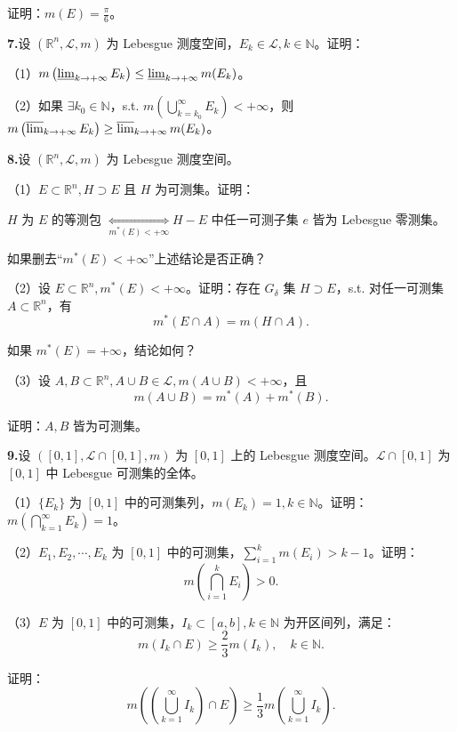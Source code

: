 \documentclass[11pt,a4paper]{article}
\begin{document}
\par\noindent 证明：$m(E)=\frac{\pi}{6}$。
\par{}\noindent\textbf{7.}\quad 设 $(\mathbb R^n,\mathcal L,m)$ 为 Lebesgue 测度空间，$E_k\in\mathcal L,k\in\mathbb N$。证明：
\par\noindent （1）$m\left(\varliminf_{k\to+\infty}E_k\right)\leq\varliminf_{k\to+\infty}m(E_k)$。
\par\noindent （2）如果 $\exists k_0\in\mathbb N$，s.t. $m\left(\bigcup_{k=k_0}^\infty E_k\right)<+\infty$，则 $m\left(\varlimsup_{k\to+\infty}E_k\right)\geq\varlimsup_{k\to+\infty}m(E_k)$。
\par{}\noindent\textbf{8.}\quad 设 $(\mathbb R^n,\mathcal L,m)$ 为 Lebesgue 测度空间。
\par\noindent （1）$E\subset\mathbb R^n,H\supset E$ 且 $H$ 为可测集。证明：
\par\noindent $H$ 为 $E$ 的等测包 $\underset{m^*(E)<+\infty}{\Longleftrightarrow}H-E$ 中任一可测子集 $e$ 皆为 Lebesgue 零测集。
\par\noindent 如果删去“$m^*(E)<+\infty$”上述结论是否正确？
\par\noindent （2）设 $E\subset\mathbb R^n,m^*(E)<+\infty$。证明：存在 $G_\delta$ 集 $H\supset E$，s.t. 对任一可测集 $A\subset\mathbb R^n$，有
\[m^*(E\cap A)=m(H\cap A).\]
\par\noindent 如果 $m^*(E)=+\infty$，结论如何？
\par\noindent （3）设 $A,B\subset\mathbb R^n,A\cup B\in\mathcal L,m(A\cup B)<+\infty$，且
\[m(A\cup B)=m^*(A)+m^*(B).\]
\par\noindent 证明：$A,B$ 皆为可测集。
\par{}\noindent\textbf{9.}\quad 设 $([0,1],\mathcal L\cap[0,1],m)$ 为 $[0,1]$ 上的 Lebesgue 测度空间。$\mathcal L\cap[0,1]$ 为 $[0,1]$ 中 Lebesgue 可测集的全体。
\par\noindent （1）$\{E_k\}$ 为 $[0,1]$ 中的可测集列，$m(E_k)=1,k\in\mathbb N$。证明：$m\left(\bigcap_{k=1}^\infty E_k\right)=1$。
\par\noindent （2）$E_1,E_2,\cdots,E_k$ 为 $[0,1]$ 中的可测集，$\sum_{i=1}^k m(E_i)>k-1$。证明：
\[m\left(\bigcap_{i=1}^k E_i\right)>0.\]
\par\noindent （3）$E$ 为 $[0,1]$ 中的可测集，$I_k\subset[a,b],k\in\mathbb N$ 为开区间列，满足：
\[m(I_k\cap E)\geq\frac23m(I_k),\quad k\in\mathbb N.\]
\par\noindent 证明：
\[m\left(\left(\bigcup_{k=1}^\infty I_k\right)\cap E\right)\geq\frac13 m\left(\bigcup_{k=1}^\infty I_k\right).\]
\end{document}
